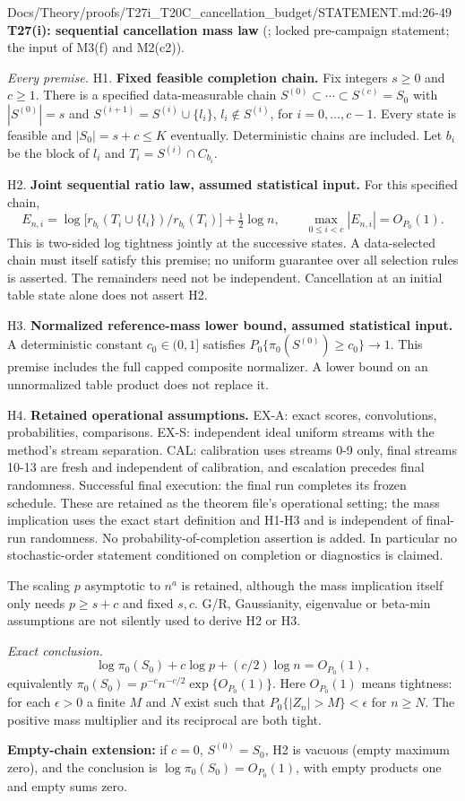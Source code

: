 \begin{stmt}{Docs/Theory/proofs/T27i_T20C_cancellation_budget/STATEMENT.md:26-49}
\textbf{T27(i): sequential cancellation mass law} (; locked pre-campaign statement; the input of M3(f) and M2(c2)).\par
\emph{Every premise.} H1. \textbf{Fixed feasible completion chain.} Fix integers $s\ge0$ and $c\ge1$. There is a specified data-measurable chain $S^{(0)}\subset\cdots\subset S^{(c)}=S_0$ with $|S^{(0)}|=s$ and $S^{(i+1)}=S^{(i)}\cup\{l_i\}$, $l_i\notin S^{(i)}$, for $i=0,\dots,c-1$. Every state is feasible and $|S_0|=s+c\le K$ eventually. Deterministic chains are included. Let $b_i$ be the block of $l_i$ and $T_i=S^{(i)}\cap C_{b_i}$.\par
H2. \textbf{Joint sequential ratio law, assumed statistical input.} For this specified chain,
\[E_{n,i}=\log\bigl[r_{b_i}(T_i\cup\{l_i\})/r_{b_i}(T_i)\bigr]+\tfrac12\log n,\qquad \max_{0\le i<c}|E_{n,i}|=O_{P_0}(1).\]
This is two-sided log tightness jointly at the successive states. A data-selected chain must itself satisfy this premise; no uniform guarantee over all selection rules is asserted. The remainders need not be independent. Cancellation at an initial table state alone does not assert H2.\par
H3. \textbf{Normalized reference-mass lower bound, assumed statistical input.} A deterministic constant $c_0\in(0,1]$ satisfies $P_0\{\pi_0(S^{(0)})\ge c_0\}\to1$. This premise includes the full capped composite normalizer. A lower bound on an unnormalized table product does not replace it.\par
H4. \textbf{Retained operational assumptions.} EX-A: exact scores, convolutions, probabilities, comparisons. EX-S: independent ideal uniform streams with the method's stream separation. CAL: calibration uses streams 0-9 only, final streams 10-13 are fresh and independent of calibration, and escalation precedes final randomness. Successful final execution: the final run completes its frozen schedule. These are retained as the theorem file's operational setting; the mass implication uses the exact start definition and H1-H3 and is independent of final-run randomness. No probability-of-completion assertion is added. In particular no stochastic-order statement conditioned on completion or diagnostics is claimed.\par
The scaling $p$ asymptotic to $n^a$ is retained, although the mass implication itself only needs $p\ge s+c$ and fixed $s,c$. G/R, Gaussianity, eigenvalue or beta-min assumptions are not silently used to derive H2 or H3.\par
\emph{Exact conclusion.}
\[\log\pi_0(S_0)+c\log p+(c/2)\log n=O_{P_0}(1),\]
equivalently $\pi_0(S_0)=p^{-c}n^{-c/2}\exp\{O_{P_0}(1)\}$. Here $O_{P_0}(1)$ means tightness: for each $\epsilon>0$ a finite $M$ and $N$ exist such that $P_0\{|Z_n|>M\}<\epsilon$ for $n\ge N$. The positive mass multiplier and its reciprocal are both tight.\par
\textbf{Empty-chain extension:} if $c=0$, $S^{(0)}=S_0$, H2 is vacuous (empty maximum zero), and the conclusion is $\log\pi_0(S_0)=O_{P_0}(1)$, with empty products one and empty sums zero.
\end{stmt}
